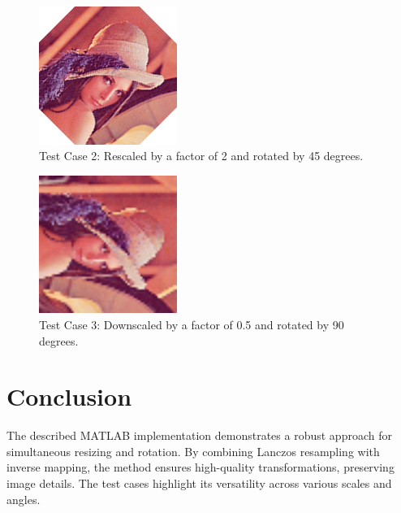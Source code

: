 \documentclass{article}
\begin{document}
\begin{figure}[h!]
    \centering
    \includegraphics[width=0.4\textwidth]{lena_2.00@45.00.png}
    \caption{Test Case 2: Rescaled by a factor of 2 and rotated by 45 degrees.}
\end{figure}

\begin{figure}[h!]
    \centering
    \includegraphics[width=0.4\textwidth]{lena_0.50@90.00.png}
    \caption{Test Case 3: Downscaled by a factor of 0.5 and rotated by 90 degrees.}
\end{figure}

\section{Conclusion}

The described MATLAB implementation demonstrates a robust approach for simultaneous resizing and rotation. By combining Lanczos resampling with inverse mapping, the method ensures high-quality transformations, preserving image details. The test cases highlight its versatility across various scales and angles.
\end{document}
